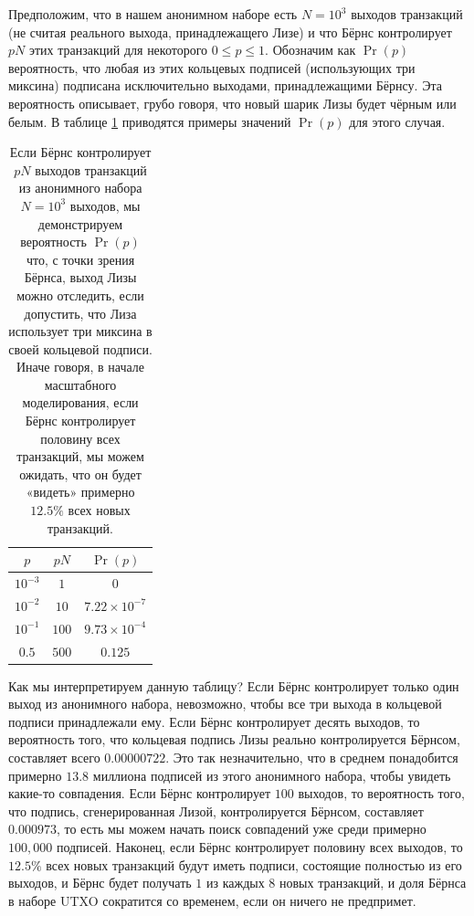 \documentclass{mrl}
\begin{document}
Предположим, что в нашем анонимном наборе есть $N=10^3$ выходов транзакций (не считая реального выхода, принадлежащего Лизе) и что Бёрнс контролирует $pN$ этих транзакций для некоторого $0 \leq p \leq 1$. Обозначим как $\Pr(p)$ вероятность, что любая из этих кольцевых подписей (использующих три миксина) подписана исключительно выходами, принадлежащими Бёрнсу. Эта вероятность описывает, грубо говоря, что новый шарик Лизы будет чёрным или белым. В таблице \ref{3mixins} приводятся примеры значений $\Pr(p)$ для этого случая.

\begin{table}[!h]
\begin{center}
\begin{tabular}{c|c|c}
$p$ & $pN$ & $\Pr(p)$ \\ \hline
$10^{-3}$ & $1$ & $0$ \\
$10^{-2}$ & $10$ & $7.22\times 10^{-7}$ \\
$10^{-1}$ & $100$ & $9.73 \times 10^{-4}$\\
$0.5$ & $500$ & $0.125$
\end{tabular}
\caption{Если Бёрнс контролирует $pN$ выходов транзакций из анонимного набора $N=10^3$ выходов, мы демонстрируем вероятность $\Pr(p)$ что, с точки зрения Бёрнса, выход Лизы можно отследить, если допустить, что Лиза использует три миксина в своей кольцевой подписи. Иначе говоря, в начале масштабного моделирования, если Бёрнс контролирует половину всех транзакций, мы можем ожидать, что он будет «видеть» примерно $12.5\%$ всех новых транзакций.}
\label{3mixins}
\end{center}
\end{table}

Как мы интерпретируем данную таблицу? Если Бёрнс контролирует только один выход из анонимного набора, невозможно, чтобы все три выхода в кольцевой подписи принадлежали ему. Если Бёрнс контролирует десять выходов, то вероятность того, что кольцевая подпись Лизы реально контролируется Бёрнсом, составляет всего $0.00000722$. Это так незначительно, что в среднем понадобится примерно $13.8$ миллиона подписей из этого анонимного набора, чтобы увидеть какие-то совпадения. Если Бёрнс контролирует $100$ выходов, то вероятность того, что подпись, сгенерированная Лизой, контролируется Бёрнсом, составляет $0.000973$, то есть мы можем начать поиск совпадений уже среди примерно $100,000$ подписей. Наконец, если Бёрнс контролирует половину всех выходов, то $12.5\%$ всех новых транзакций будут иметь подписи, состоящие полностью из его выходов, и Бёрнс будет получать $1$ из каждых $8$ новых транзакций, и доля Бёрнса в наборе UTXO сократится со временем, если он ничего не предпримет.
\end{document}
